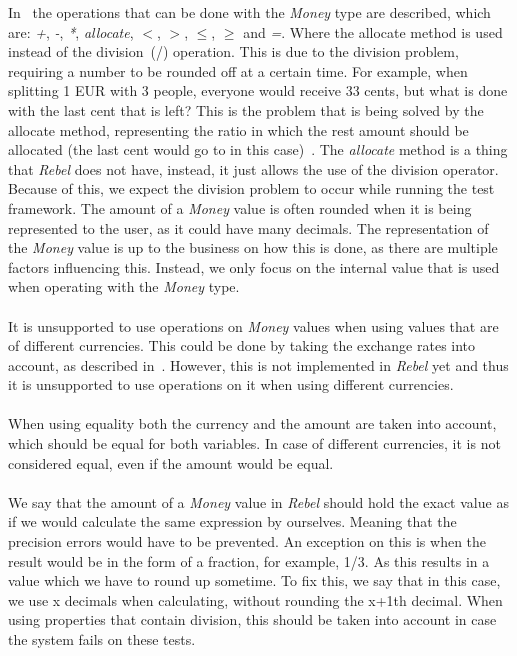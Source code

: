 In~\cite{fowler2002patterns} the operations that can be done with the
\textit{Money} type are described, which are: \textit{+}, \textit{-},
\textit{*}, \textit{allocate}, \textit{$<$}, \textit{$>$}, \textit{$\leq$},
\textit{$\geq$} and \textit{=}. Where the allocate method is used instead of the
division~(/) operation. This is due to the division problem, requiring a number
to be rounded off at a certain time. For example, when splitting 1 EUR with 3
people, everyone would receive 33 cents, but what is done with the last cent
that is left? This is the problem that is being solved by the allocate method,
representing the ratio in which the rest amount should be allocated (the last
cent would go to in this case)~\cite{fowler2002patterns}. The \textit{allocate}
method is a thing that \textit{Rebel} does not have, instead, it just allows the
use of the division operator. Because of this, we expect the division problem to
occur while running the test framework. The amount of a \textit{Money} value is
often rounded when it is being represented to the user, as it could have many
decimals. The representation of the \textit{Money} value is up to the business
on how this is done, as there are multiple factors influencing this. Instead, we
only focus on the internal value that is used when operating with the
\textit{Money} type.\\
\\
It is unsupported to use operations on \textit{Money} values when using values
that are of different currencies. This could be done by taking the exchange
rates into account, as described in~\cite{fowler2002patterns}. However, this is
not implemented in \textit{Rebel} yet and thus it is unsupported to use
operations on it when using different currencies.\\
\\
When using equality both the currency and the amount are taken into account,
which should be equal for both variables. In case of different currencies, it is
not considered equal, even if the amount would be equal.\\
\\
We say that the amount of a \textit{Money} value in \textit{Rebel} should hold
the exact value as if we would calculate the same expression by ourselves.
Meaning that the precision errors would have to be prevented. An exception on
this is when the result would be in the form of a fraction, for example, 1/3. As
this results in a value which we have to round up sometime. To fix this, we say
that in this case, we use x decimals when calculating, without rounding the
x+1th decimal. When using properties that contain division, this should be taken
into account in case the system fails on these tests.

